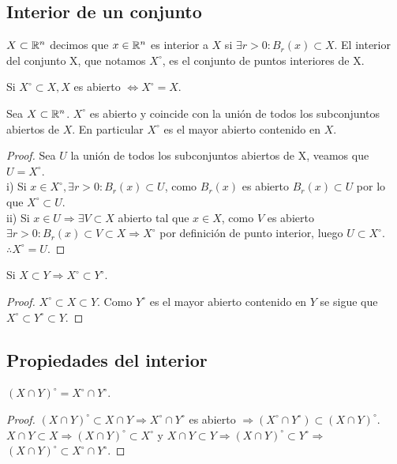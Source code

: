 \subsection{Interior de un conjunto}

\begin{definition}[Interior]
  $X \subset \mathbb{R}^n$ decimos que $x \in \mathbb{R}^n$ es interior a $X$ si $\exists r > 0 : B_r(x) \subset X$. El interior del conjunto X, que notamos $X^{\circ}$, es el conjunto de puntos interiores de X.
\end{definition}

\begin{note}
  Si $X^{\circ} \subset X, X$ es abierto $\iff X^{\circ} = X$.
\end{note}

\begin{prop}
  Sea $X \subset \mathbb{R}^n$. $X^{\circ}$ es abierto y coincide con la unión de todos los subconjuntos abiertos de $X$. En particular $X^{\circ}$ es el mayor abierto contenido en $X$.
  \begin{proof}
    Sea $U$ la unión de todos los subconjuntos abiertos de X, veamos que $U = X^{\circ}$. \\
    i) Si $x \in X^{\circ}, \exists r > 0 : B_r(x) \subset U$, como $B_r(x)$ es abierto $B_r(x) \subset U$ por lo que $X^{\circ} \subset U$. \\
    ii) Si $x \in U \Rightarrow \exists V \subset X$ abierto tal que $x \in X$, como $V$ es abierto $\exists r > 0 : B_r(x) \subset V \subset X \Rightarrow X^{\circ}$ por definición de punto interior, luego $U \subset X^{\circ}$. \\
    $\therefore X^{\circ} = U$.
  \end{proof}
\end{prop}

\begin{corollary}
  Si $X \subset Y \Rightarrow X^{\circ} \subset Y^{\circ}$.
  \begin{proof}
    $X^{\circ} \subset X \subset Y$. Como $Y^{\circ}$ es el mayor abierto contenido en $Y$ se sigue que $X^{\circ} \subset Y^{\circ} \subset Y$.
  \end{proof}
\end{corollary}

\subsection{Propiedades del interior}

\begin{prop}
  $(X \cap Y)^{\circ} = X^{\circ} \cap Y^{\circ}$.
  \begin{proof}
    $(X \cap Y)^{\circ} \subset X \cap Y \Rightarrow X^{\circ} \cap Y^{\circ}$ es abierto $\Rightarrow (X^{\circ} \cap Y^{\circ}) \subset (X \cap Y)^{\circ}$. \\
    $X \cap Y \subset X \Rightarrow (X \cap Y)^{\circ} \subset X^{\circ}$ y $X \cap Y \subset Y \Rightarrow (X \cap Y)^{\circ} \subset Y^{\circ} \Rightarrow$ \\
    $(X \cap Y)^{\circ} \subset X^{\circ} \cap Y^{\circ}$.
  \end{proof}
\end{prop}

